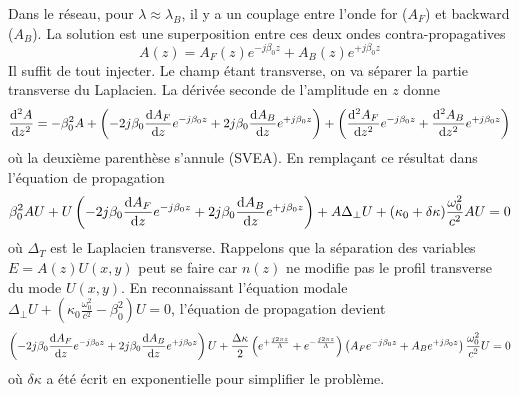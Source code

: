 Dans le réseau, pour $\lambda\approx\lambda_B$, il y a un couplage entre l'onde for ($A_F$) 
et backward ($A_B$). La solution est une superposition entre ces deux ondes contra-propagatives
\begin{equation}
A(z) = {A_F}(z){e^{ - j{\beta _0}z}} + {A_B}(z){e^{ + j{\beta _0}z}}
\end{equation}
Il suffit de tout injecter. Le champ étant transverse, on va séparer la partie transverse du 
Laplacien. La dérivée seconde de l'amplitude en $z$ donne
\begin{equation}
\frac{{{{\rm{d}}^2}A}}{{{\rm{d}}{z^2}}} =  - \beta _0^2A + \left( { - 2j{\beta _0}\frac{{{\rm{d}}{A_F}}}{{{\rm{d}}z}}{e^{ - j{\beta _0}z}} + 2j{\beta _0}\frac{{{\rm{d}}{A_B}}}{{{\rm{d}}z}}{e^{ + j{\beta _0}z}}} \right) + \left( {\frac{{{{\rm{d}}^2}{A_F}}}{{{\rm{d}}{z^2}}}{e^{ - j{\beta _0}z}} + \frac{{{{\rm{d}}^2}{A_B}}}{{{\rm{d}}{z^2}}}{e^{ + j{\beta _0}z}}} \right)
\end{equation}
où la deuxième parenthèse s'annule (SVEA). En remplaçant ce résultat dans l'équation de propagation
\begin{equation}
\beta _0^2AU + U\left( { - 2j{\beta _0}\frac{{{\rm{d}}{A_F}}}{{{\rm{d}}z}}{e^{ - j{\beta _0}z}} + 2j{\beta _0}\frac{{{\rm{d}}{A_B}}}{{{\rm{d}}z}}{e^{ + j{\beta _0}z}}} \right) + A{\Delta _ \bot }U + ({\kappa _0} + \delta \kappa )\frac{{\omega _0^2}}{{{c^2}}}AU = 0
\end{equation}
où $\Delta_T$ est le Laplacien transverse. Rappelons que la séparation des variables 
$E=A(z)U(x,y)$ peut se faire car $n(z)$ ne modifie pas le profil transverse du mode $U(x,y)$.
En reconnaissant l'équation modale ${\Delta _ \bot }U + ({\kappa _0}\frac{{\omega _0^2}}{{{c^2}}} -
 \beta _0^2)U = 0$, l'équation de propagation devient
 \begin{equation}
 \left( { - 2j{\beta _0}\frac{{{\rm{d}}{A_F}}}{{{\rm{d}}z}}{e^{ - j{\beta _0}z}} + 2j{\beta _0}\frac{{{\rm{d}}{A_B}}}{{{\rm{d}}z}}{e^{ + j{\beta _0}z}}} \right)U + \frac{{\Delta \kappa }}{2}\left( {{e^{ + \frac{{j2\pi z}}{\Lambda }}} + {e^{ - \frac{{j2\pi z}}{\Lambda }}}} \right)\left( {{A_F}{e^{ - j{\beta _0}z}} + {A_B}{e^{ + j{\beta _0}z}}} \right)\frac{{\omega _0^2}}{{{c^2}}}U = 0
 \end{equation}
où $\delta\kappa$ a été écrit en exponentielle pour simplifier le problème. \\

